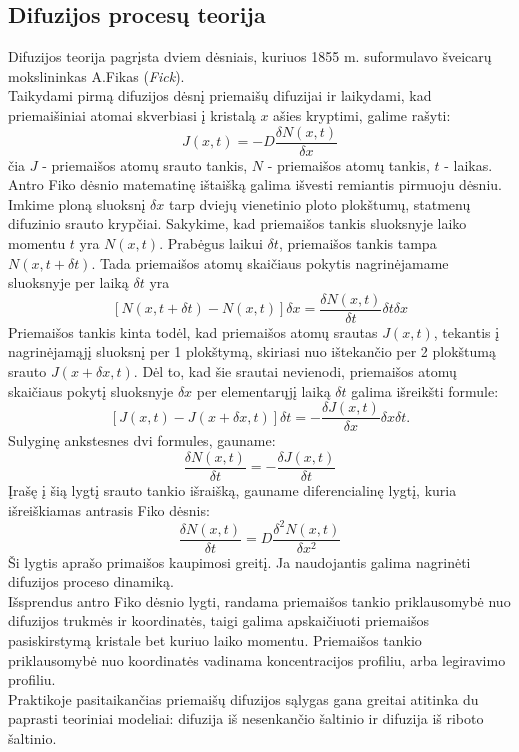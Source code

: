 \documentclass[11pt,a4paper]{article}
\begin{document}
\subsection{Difuzijos procesų teorija}
Difuzijos teorija pagrįsta dviem dėsniais, kuriuos 1855 m. suformulavo šveicarų mokslininkas A.Fikas (\emph{Fick}).\\
Taikydami pirmą difuzijos dėsnį priemaišų difuzijai ir laikydami, kad priemaišiniai atomai skverbiasi į kristalą $x$ ašies kryptimi, galime rašyti:
\[ J(x,t) = - D \frac{\delta N(x,t)}{\delta x}\]
čia $J$ - priemaišos atomų srauto tankis, $N$ - priemaišos atomų tankis, $t$ - laikas.\\
Antro Fiko dėsnio matematinę ištaišką galima išvesti remiantis pirmuoju dėsniu.\\
Imkime ploną sluoksnį $\delta x$ tarp dviejų vienetinio ploto plokštumų, statmenų difuzinio srauto krypčiai. 
Sakykime, kad priemaišos tankis sluoksnyje laiko momentu $t$ yra $N(x,t)$. Prabėgus laikui $\delta t$, 
priemaišos tankis tampa $N(x,t+ \delta t)$. Tada priemaišos atomų skaičiaus pokytis nagrinėjamame sluoksnyje per laiką $\delta t$ yra
\[ [ N (x,t+\delta t ) - N(x,t) ] \delta x = \frac{\delta N(x,t)}{\delta t} \delta t \delta x\]
Priemaišos tankis kinta todėl, kad priemaišos atomų srautas $J(x,t)$, tekantis į nagrinėjamąjį sluoksnį per 1 plokštymą, 
skiriasi nuo ištekančio per 2 plokštumą srauto $J(x+\delta x,t)$. Dėl to, kad šie srautai nevienodi, 
priemaišos atomų skaičiaus pokytį sluoksnyje $\delta x$ per elementarųjį laiką $\delta t$ galima išreikšti formule:
\[ [J(x,t) - J(x + \delta x,t ) ] \delta t = - \frac{\delta J(x,t)}{\delta x} \delta x \delta t. \]
Sulyginę ankstesnes dvi formules, gauname:
\[ \frac{\delta N(x,t)}{\delta t} = - \frac{\delta J(x,t)}{\delta t} \]
Įrašę į šią lygtį srauto tankio išraišką, gauname diferencialinę lygtį, kuria išreiškiamas antrasis Fiko dėsnis:
\[ \frac{\delta N(x,t)}{\delta t} = D \frac{\delta^2 N(x,t)}{\delta x^2} \]
Ši lygtis aprašo primaišos kaupimosi greitį. Ja naudojantis galima nagrinėti difuzijos proceso dinamiką.\\
Išsprendus antro Fiko dėsnio lygti, randama priemaišos tankio priklausomybė nuo difuzijos trukmės ir koordinatės, 
taigi galima apskaičiuoti priemaišos pasiskirstymą kristale bet kuriuo laiko momentu. 
Priemaišos tankio priklausomybė nuo koordinatės vadinama koncentracijos profiliu, arba legiravimo profiliu.\\
Praktikoje pasitaikančias priemaišų difuzijos sąlygas gana greitai atitinka du paprasti teoriniai modeliai: difuzija iš nesenkančio šaltinio ir difuzija iš riboto šaltinio.\\
\end{document}

